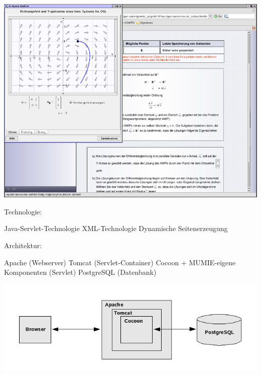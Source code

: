 \documentclass{article}
\begin{document}
\pagebreak


\begin{center}
\hspace*{-0.5cm} \includegraphics[width=16cm]{mumie_screenshot_02}
\end{center}

\pagebreak


\begin{mylist}

\pitem Technologie:
\begin{mylist}[\mylabelitemii]
  \pitem Java-Servlet-Technologie
  \pitem XML-Technologie
  \pitem Dynamische Seitenerzeugung
\end{mylist}

\pitem Architektur:
\begin{mylist}[\mylabelitemii]
  \pitem Apache (Webserver)
  \pitem Tomcat (Servlet-Container)
  \pitem Cocoon + MUMIE-eigene Komponenten (Servlet)
  \pitem PostgreSQL (Datenbank) 
\end{mylist}

\end{mylist}

\pagebreak


\vspace{2cm}

\hspace*{-1.5cm}\includegraphics{arch_mumie}
\end{document}
